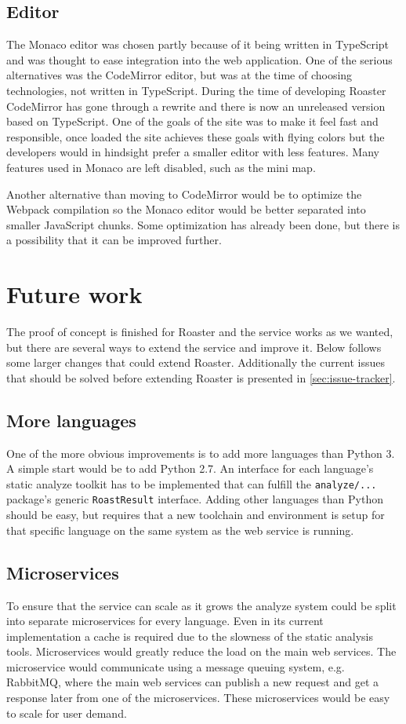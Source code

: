 \documentclass[12pt,a4paper]{report}
\begin{document}
\section{Editor}
The Monaco editor was chosen partly because of it being written in TypeScript and was thought to ease integration into the web application. One of the serious alternatives was the CodeMirror editor\cite{codemirror}, but was at the time of choosing technologies, not written in TypeScript. During the time of developing Roaster CodeMirror has gone through a rewrite and there is now an unreleased version based on TypeScript\cite{codemirror-ts}. One of the goals of the site was to make it feel fast and responsible, once loaded the site achieves these goals with flying colors but the developers would in hindsight prefer a smaller editor with less features. Many features used in Monaco are left disabled, such as the mini map.

Another alternative than moving to CodeMirror would be to optimize the Webpack compilation so the Monaco editor would be better separated into smaller JavaScript chunks. Some optimization has already been done, but there is a possibility that it can be improved further.

\chapter{Future work}
\label{sec:future-work}
The proof of concept is finished for Roaster and the service works as we wanted, but there are several ways to extend the service and improve it. Below follows some larger changes that could extend Roaster. Additionally the current issues that should be solved before extending Roaster is presented in \autoref{sec:issue-tracker}.

\section{More languages}
One of the more obvious improvements is to add more languages than Python 3. A simple start would be to add Python 2.7. An interface for each language's static analyze toolkit has to be implemented that can fulfill the \texttt{analyze/...} package's generic \texttt{RoastResult} interface. Adding other languages than Python should be easy, but requires that a new toolchain and environment is setup for that specific language on the same system as the web service is running.

\section{Microservices}
To ensure that the service can scale as it grows the analyze system could be split into separate microservices for every language. Even in its current implementation a cache is required due to the slowness of the static analysis tools. Microservices would greatly reduce the load on the main web services. The microservice would communicate using a message queuing system, e.g. RabbitMQ, where the main web services can publish a new request and get a response later from one of the microservices. These microservices would be easy to scale for user demand.
\end{document}
